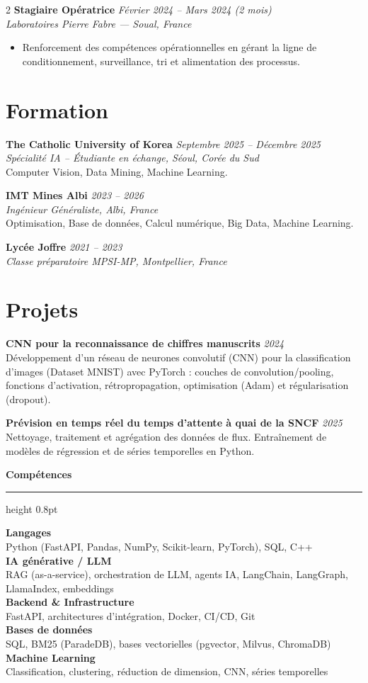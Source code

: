 \documentclass[10.5pt,a4paper]{article}
\newcommand{\sectionrule}{\vspace{-6pt}{\color{accent}\hrule height 1pt}\vspace{3pt}}
\newcommand{\subsectitle}[1]{%
  {\color{accent}\bfseries\large #1}\\[-2pt]
  {\color{accent}\hrule height 0.8pt}\vspace{4pt}
}
\newcommand{\cvexp}[5]{%
  \noindent\textbf{#1} \hfill {\itshape\color{graytext}\small #4}\\
  {\itshape #2 --- #3}\\[-6pt]
  #5
  \vspace{9pt}
}
\newcommand{\cvedu}[5]{%
  \noindent\textbf{#1} \hfill {\itshape\color{graytext}\small #4}\\
  {\itshape #2, #3}\\[1pt]
  {\small #5}
  \vspace{2pt}
}
\newcommand{\cveduplain}[4]{%
  \noindent\textbf{#1} \hfill {\itshape\color{graytext}\small #4}\\
  {\itshape #2, #3}
  \vspace{2pt}
}
\newcommand{\cvproject}[3]{%
  \noindent\textbf{#1} \hfill {\itshape\color{graytext}\small #2}\\[1pt]
  {\small #3}
  \vspace{3pt}
}
\newcommand{\sidebarline}[2]{%
  \noindent\textbf{\small #1}\\
  {\small #2}\\[3pt]
}
\begin{document}
\begin{paracol}{2}
\cvexp{Stagiaire Opératrice}{Laboratoires Pierre Fabre}{Soual, France}{Février 2024 -- Mars 2024 (2 mois)}{%
  \begin{itemize}[leftmargin=12pt, itemsep=2pt, topsep=0pt, partopsep=0pt, parsep=0pt]
    \item Renforcement des compétences opérationnelles en gérant la ligne de conditionnement, surveillance, tri et alimentation des processus.
  \end{itemize}
}

\section*{Formation}
\sectionrule

\cvedu{The Catholic University of Korea}{Spécialité IA -- Étudiante en échange}{Séoul, Corée du Sud}{Septembre 2025 -- Décembre 2025}{Computer Vision, Data Mining, Machine Learning.}

\cvedu{IMT Mines Albi}{Ingénieur Généraliste}{Albi, France}{2023 -- 2026}{Optimisation, Base de données, Calcul numérique, Big Data, Machine Learning.}

\cveduplain{Lycée Joffre}{Classe préparatoire MPSI-MP}{Montpellier, France}{2021 -- 2023}

\section*{Projets}
\sectionrule

\cvproject{CNN pour la reconnaissance de chiffres manuscrits}{2024}{Développement d'un réseau de neurones convolutif (CNN) pour la classification d'images (Dataset MNIST) avec PyTorch : couches de convolution/pooling, fonctions d'activation, rétropropagation, optimisation (Adam) et régularisation (dropout).}

\cvproject{Prévision en temps réel du temps d'attente à quai de la SNCF}{2025}{Nettoyage, traitement et agrégation des données de flux. Entraînement de modèles de régression et de séries temporelles en Python.}

\switchcolumn

\vspace{2pt}

\subsectitle{Compétences}

\sidebarline{Langages}{Python (FastAPI, Pandas, NumPy, Scikit-learn, PyTorch), SQL, C++}
\sidebarline{IA générative / LLM}{RAG (as-a-service), orchestration de LLM, agents IA, LangChain, LangGraph, LlamaIndex, embeddings}
\sidebarline{Backend \& Infrastructure}{FastAPI, architectures d'intégration, Docker, CI/CD, Git}
\sidebarline{Bases de données}{SQL, BM25 (ParadeDB), bases vectorielles (pgvector, Milvus, ChromaDB)}
\sidebarline{Machine Learning}{Classification, clustering, réduction de dimension, CNN, séries temporelles}


\end{paracol}
\end{document}
